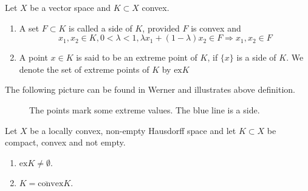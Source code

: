 \begin{definition}
	Let $X$ be a vector space and $K\subset X$ convex.
	\begin{enumerate}
		\item A set $F\subset K$ is called a side of $K$, provided $F$ is convex and 
		\[
		x_1,x_2\in K, 0<\lambda<1,\lambda x_1+(1-\lambda)x_2\in F\Rightarrow x_1,x_2\in F
		\]
		\item A point $x\in K$ is said to be an extreme point of $K$, if $\{x\}$ is a side of $K$.
We denote the set of extreme points of $K$ by $\mathrm{ex}K$
\end{enumerate}
\end{definition}

The following picture can be found in Werner \cite{werner:funkana} and illustrates above definition.

\begin{figure}[h]
\begin{centering}
\caption{The points mark some extreme values. The blue line is a side.}
\end{centering}
\end{figure}

\begin{theorem}\label{thm:krein-milman}
	Let $X$ be a locally convex, non-empty Hausdorff space and let $K\subset X$ be compact, convex and not empty.
	\begin{enumerate} 
		\item $\mathrm{ex}K\neq \emptyset$\label{krein-milman-1}.
		\item $K=\overline{\mathrm{conv}}\mathrm{ex}K$\label{krein-milman-2}.
	\end{enumerate}
\end{theorem}

